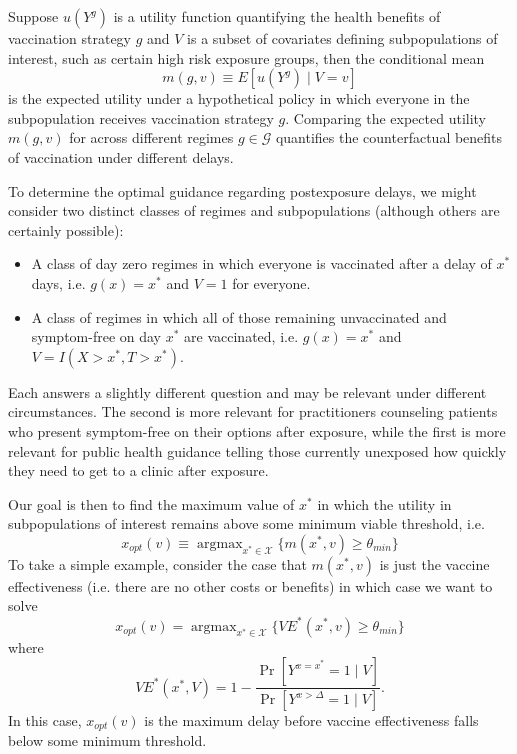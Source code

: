 \begin{appendices}
\begin{refsection}
    Suppose $u(Y^g)$ is a utility function quantifying the health benefits of vaccination strategy $g$ and $V$ is a subset of covariates defining subpopulations of interest, such as certain high risk exposure groups, then the conditional mean
    $$m(g, v) \equiv E[u(Y^g) \mid V = v]$$
    is the expected utility under a hypothetical policy in which everyone in the subpopulation receives vaccination strategy $g$. Comparing the expected utility $m(g, v)$ for across different regimes $g \in \mathcal{G}$ quantifies the counterfactual benefits of vaccination under different delays.
     
    To determine the optimal guidance regarding postexposure delays, we might consider two distinct classes of regimes and subpopulations (although others are certainly possible):
    \begin{itemize}
        \item A class of day zero regimes in which everyone is vaccinated after a delay of $x^*$ days, i.e. $g(x) = x^*$ and $V = 1$ for everyone.
        \item A class of regimes in which all of those remaining unvaccinated and symptom-free on day $x^*$ are vaccinated, i.e. $g(x) = x^*$ and $V = I(X > x^*, T > x^*)$.
    \end{itemize}
    Each answers a slightly different question and may be relevant under different circumstances. The second is more relevant for practitioners counseling patients who present symptom-free on their options after exposure, while the first is more relevant for public health guidance telling those currently unexposed how quickly they need to get to a clinic after exposure.

    Our goal is then to find the maximum value of $x^*$ in which the utility in subpopulations of interest remains above some minimum viable threshold, i.e.
    $$x_{opt}(v) \equiv \operatorname{argmax}_{x^* \in \mathcal{X}} \{m(x^*, v) \geq \theta_{min} \}$$
    To take a simple example, consider the case that $m(x^*, v)$ is just the vaccine effectiveness (i.e. there are no other costs or benefits) in which case we want to solve  
    $$x_{opt}(v) = \operatorname{argmax}_{x^* \in \mathcal{X}} \{VE^*(x^*, v) \geq \theta_{min} \}$$
    where 
    $$VE^*(x^*, V) =  1 - \frac{\Pr[Y^{x = x^*} = 1 \mid V]}{\Pr[Y^{x > \Delta} = 1 \mid V]}.$$
    In this case, $x_{opt}(v)$ is the maximum delay before vaccine effectiveness falls below some minimum threshold.


\end{refsection}
\end{appendices}
